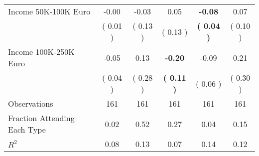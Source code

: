 \begin{table}[H]
{\begin{tabular}{lccccc}
\quad Income 50K-100K Euro &     -0.00 &     -0.03 &      0.05 & \textbf{    -0.08} &      0.07 \\
\quad  & (     0.01 ) & (     0.13 )  & (     0.13 )  & \textbf{(     0.04 )} & (     0.10 ) \\
\quad Income 100K-250K Euro &     -0.05 &      0.13 & \textbf{    -0.20} &     -0.09 &      0.21 \\
\quad  & (     0.04 ) & (     0.28 )  & \textbf{(     0.11 )}  & (     0.06 ) & (     0.30 ) \\
\midrule
Observations & 161 & 161 & 161 & 161 & 161 \\
Fraction Attending Each Type &      0.02 &      0.52 &      0.27 &      0.04 &      0.15 \\
\midrule
$ R^2$ &      0.08 &      0.13 &      0.07 &      0.14 &      0.12 \\
\bottomrule
\end{tabular}}
\end{table}
